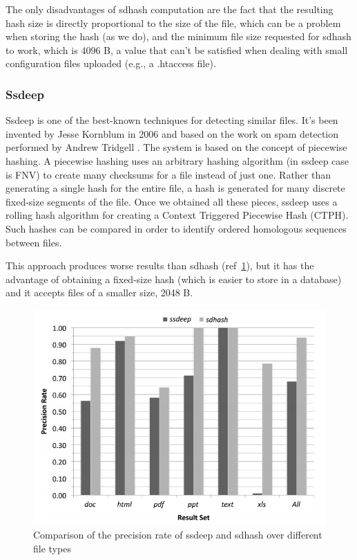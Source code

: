 The only disadvantages of sdhash computation are the fact that the resulting hash size is directly proportional to the size of the file, which can be a problem when storing the hash (as we do), and the minimum file size requested for sdhash to work, which is 4096 B, a value that can't be satisfied when dealing with small configuration files uploaded (e.g., a .htaccess file).

\subsubsection{Ssdeep}
Ssdeep is one of the best-known techniques for detecting similar files. It's been invented by Jesse Kornblum \cite{ssdeep} in 2006 and based on the work on spam detection performed by Andrew Tridgell \cite{spamsum}.
The system is based on the concept of piecewise hashing. A piecewise hashing uses an arbitrary hashing algorithm (in ssdeep case is FNV) to create many checksums for a file instead of just one. Rather than generating a single hash for the entire file, a hash is generated for many discrete fixed-size segments of the file. Once we obtained all these pieces, ssdeep uses a rolling hash algorithm for creating a Context Triggered Piecewise Hash (CTPH). Such hashes can be compared in order to identify ordered homologous sequences between files.

This approach produces worse results than sdhash (ref~\ref{fig:sdhash_ssdeep}), but it has the advantage of obtaining a fixed-size hash (which is easier to store in a database) and it accepts files of a smaller size, 2048 B.

\begin{figure}[tbh]
\centerline{\includegraphics[scale=0.9]{Images/sdhash_ssdeep.jpg}}
\caption{Comparison of the precision rate of ssdeep and sdhash over different file types\label{fig:sdhash_ssdeep}}
\end{figure}

